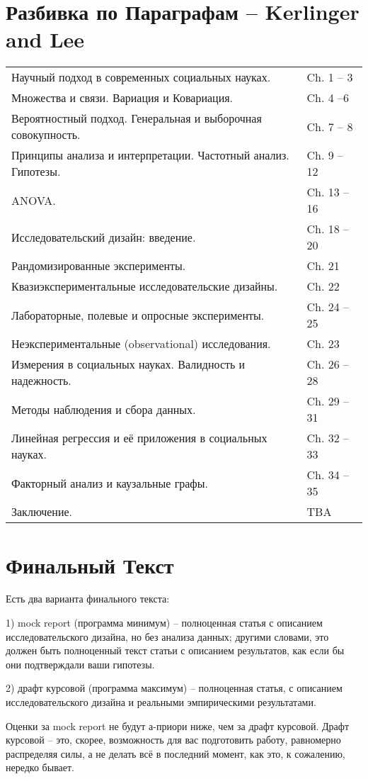 \documentclass[12pt]{article}
\begin{document}
\section*{Разбивка по Параграфам -- Kerlinger and Lee}
\begin{table}[H]
\begin{tabular}{p{}@{}p{}@{}}
Научный подход в современных социальных науках. \dotfill & Ch. 1 -- 3 \\ 
Множества и связи.  Вариация и Ковариация.\dotfill & Ch. 4 --6 \\ 
Вероятностный подход. Генеральная и выборочная совокупность. \dotfill & Ch. 7 -- 8 \\
Принципы анализа и интерпретации.  Частотный анализ. Гипотезы.\dotfill & Ch. 9 -- 12 \\
ANOVA. \dotfill & Ch.  13 -- 16 \\
Исследовательский дизайн: введение. \dotfill & Ch. 18 -- 20 \\
Рандомизированные эксперименты. \dotfill & Ch. 21 \\
Квазиэкспериментальные исследовательские дизайны. \dotfill & Ch. 22 \\
Лабораторные,  полевые и опросные эксперименты. \dotfill & Ch.  24 -- 25 \\
Неэкспериментальные (observational) исследования. \dotfill & Ch.  23 \\
Измерения в социальных науках. Валидность и надежность. \dotfill & Ch. 26 -- 28 \\
Методы наблюдения и сбора данных.  \dotfill & Ch. 29 -- 31 \\
Линейная регрессия и её приложения в социальных науках.  \dotfill & Ch. 32 -- 33 \\
Факторный анализ и каузальные графы.  \dotfill & Ch. 34 -- 35 \\
Заключение.  \dotfill & TBA \\
\end{tabular}
\end{table}
\section*{Финальный Текст}
Есть два варианта финального текста:

1) mock report (программа минимум) -- полноценная статья с описанием исследовательского дизайна,  но без анализа данных; другими словами,  это должен быть полноценный текст статьи с описанием результатов, как если бы они подтверждали ваши гипотезы. 

2) драфт курсовой (программа максимум) -- полноценная статья,  с описанием исследовательского дизайна и реальными эмпирическими результатами.  

Оценки за mock report не будут а-приори ниже,  чем за драфт курсовой.  Драфт курсовой -- это,  скорее,  возможность для вас подготовить работу,  равномерно распределяя силы, а не делать всё в последний момент,  как это,  к сожалению, нередко бывает. 
\end{document}
